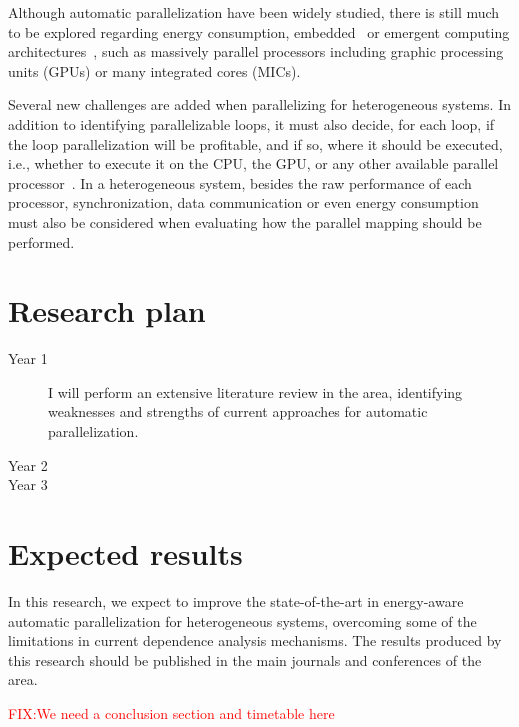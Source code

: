 \documentclass[a4paper,12pt]{article}
\newcommand\FIXME[1]{\textcolor{red}{FIX:}\textcolor{red}{#1}}
\begin{document}
Although automatic parallelization have been widely studied, there is still
much to be explored regarding energy consumption, embedded~\cite{cordes10} or
emergent computing
architectures~\cite{leung09,baskaran10,amini12,govindarajan13}, such as
massively parallel processors including graphic processing units (GPUs) or many
integrated cores (MICs).

Several new challenges are added when parallelizing for heterogeneous systems.
In addition to identifying parallelizable loops, it must also decide, for each
loop, if the loop parallelization will be profitable, and if so, where it
should be executed, i.e., whether to execute it on the CPU, the GPU, or any
other available parallel processor~\cite{tournavitis09,wang14a,leung09}.  In a
heterogeneous system, besides the raw performance of each processor,
synchronization, data communication or even energy consumption must also be
considered when evaluating how the parallel mapping should be performed.

\section{Research plan}

\begin{description}
\item[Year 1] I will perform an extensive literature review in the area, identifying
weaknesses and strengths of current approaches for automatic parallelization.

\item[Year 2] 
\item[Year 3] 
\end{description}

\section{Expected results}

In this research, we expect
to improve the state-of-the-art in energy-aware automatic parallelization
for heterogeneous systems, overcoming some of the limitations in current dependence analysis mechanisms.
The results produced by this research should be published in the main journals and conferences
of the area.

\FIXME{We need a conclusion section and timetable here}



\end{document}
